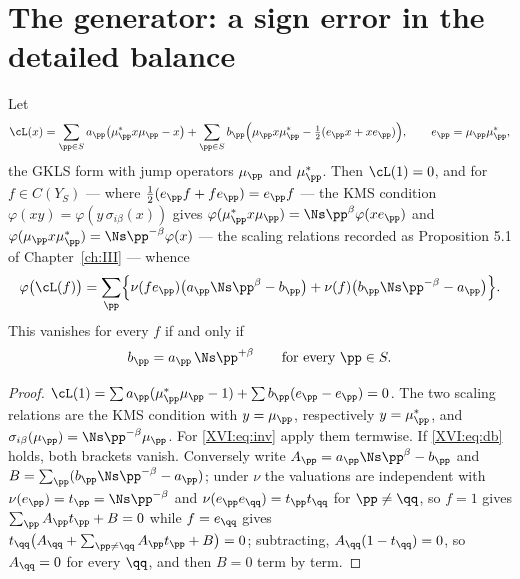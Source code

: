 \section{The generator: a sign error in the detailed balance}

\begin{proposition}\label{XVI:prop:balance}
Let
\[
\cL(x)=\sum_{\pp\in S}a_\pp\bigl(\mu_\pp^*x\mu_\pp-x\bigr)+\sum_{\pp\in S}b_\pp\Bigl(\mu_\pp x\mu_\pp^*-\tfrac12(e_\pp x+xe_\pp)\Bigr),
\qquad e_\pp=\mu_\pp\mu_\pp^* ,
\]
the GKLS form with jump operators $\mu_\pp$ and $\mu_\pp^*$. Then $\cL(1)=0$, and for
$f\in C(Y_S)$ --- where $\tfrac12(e_\pp f+fe_\pp)=e_\pp f$ --- the KMS condition
$\varphi(xy)=\varphi(y\,\sigma_{i\beta}(x))$ gives
$\varphi(\mu_\pp^*x\mu_\pp)=\Ns\pp^{\beta}\varphi(xe_\pp)$ and
$\varphi(\mu_\pp x\mu_\pp^*)=\Ns\pp^{-\beta}\varphi(x)$ --- the scaling relations recorded
as Proposition 5.1 of Chapter~\ref{ch:III} --- whence
\begin{equation}\label{XVI:eq:inv}
\varphi\bigl(\cL(f)\bigr)=\sum_{\pp}\Bigl\{\nu(fe_\pp)\bigl(a_\pp\Ns\pp^{\beta}-b_\pp\bigr)
+\nu(f)\bigl(b_\pp\Ns\pp^{-\beta}-a_\pp\bigr)\Bigr\}.
\end{equation}
This vanishes for every $f$ if and only if
\begin{equation}\label{XVI:eq:db}
b_\pp=a_\pp\,\Ns\pp^{+\beta}\qquad\text{for every }\pp\in S .
\end{equation}
\end{proposition}

\begin{proof}
$\cL(1)=\sum a_\pp(\mu_\pp^*\mu_\pp-1)+\sum b_\pp(e_\pp-e_\pp)=0$. The two scaling relations
are the KMS condition with $y=\mu_\pp$, respectively $y=\mu_\pp^*$, and
$\sigma_{i\beta}(\mu_\pp)=\Ns\pp^{-\beta}\mu_\pp$. For \eqref{XVI:eq:inv} apply them termwise.
If \eqref{XVI:eq:db} holds, both brackets vanish. Conversely write
$A_\pp=a_\pp\Ns\pp^\beta-b_\pp$ and $B=\sum_\pp(b_\pp\Ns\pp^{-\beta}-a_\pp)$; under $\nu$
the valuations are independent with $\nu(e_\pp)=t_\pp=\Ns\pp^{-\beta}$ and
$\nu(e_\pp e_{\qq})=t_\pp t_{\qq}$ for $\pp\ne\qq$, so $f=1$ gives
$\sum_\pp A_\pp t_\pp+B=0$ while $f=e_{\qq}$ gives
$t_{\qq}\bigl(A_{\qq}+\sum_{\pp\ne\qq}A_\pp t_\pp+B\bigr)=0$; subtracting,
$A_{\qq}(1-t_{\qq})=0$, so $A_{\qq}=0$ for every $\qq$, and then $B=0$ term by term.
\end{proof}

